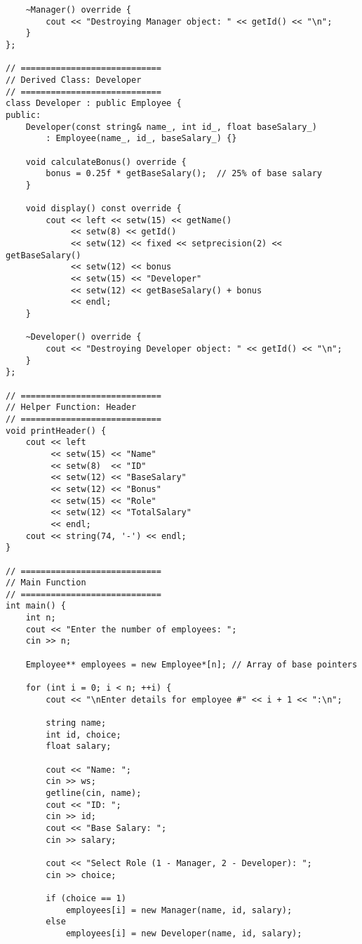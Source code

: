 \documentclass[12pt,a4paper]{article}
\begin{document}
\begin{lstlisting}
    ~Manager() override {
        cout << "Destroying Manager object: " << getId() << "\n";
    }
};

// ============================
// Derived Class: Developer
// ============================
class Developer : public Employee {
public:
    Developer(const string& name_, int id_, float baseSalary_)
        : Employee(name_, id_, baseSalary_) {}

    void calculateBonus() override {
        bonus = 0.25f * getBaseSalary();  // 25% of base salary
    }

    void display() const override {
        cout << left << setw(15) << getName()
             << setw(8) << getId()
             << setw(12) << fixed << setprecision(2) << getBaseSalary()
             << setw(12) << bonus
             << setw(15) << "Developer"
             << setw(12) << getBaseSalary() + bonus
             << endl;
    }

    ~Developer() override {
        cout << "Destroying Developer object: " << getId() << "\n";
    }
};

// ============================
// Helper Function: Header
// ============================
void printHeader() {
    cout << left
         << setw(15) << "Name"
         << setw(8)  << "ID"
         << setw(12) << "BaseSalary"
         << setw(12) << "Bonus"
         << setw(15) << "Role"
         << setw(12) << "TotalSalary"
         << endl;
    cout << string(74, '-') << endl;
}

// ============================
// Main Function
// ============================
int main() {
    int n;
    cout << "Enter the number of employees: ";
    cin >> n;

    Employee** employees = new Employee*[n]; // Array of base pointers

    for (int i = 0; i < n; ++i) {
        cout << "\nEnter details for employee #" << i + 1 << ":\n";

        string name;
        int id, choice;
        float salary;

        cout << "Name: ";
        cin >> ws;
        getline(cin, name);
        cout << "ID: ";
        cin >> id;
        cout << "Base Salary: ";
        cin >> salary;

        cout << "Select Role (1 - Manager, 2 - Developer): ";
        cin >> choice;

        if (choice == 1)
            employees[i] = new Manager(name, id, salary);
        else
            employees[i] = new Developer(name, id, salary);


\end{lstlisting}
\end{document}
